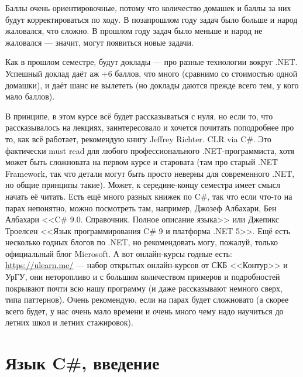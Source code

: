 \documentclass{../../text-style}
\begin{document}
Баллы очень ориентировочные, потому что количество домашек и баллы за них будут корректироваться по ходу. В позапрошлом году задач было больше и народ жаловался, что сложно. В прошлом году задач было меньше и народ не жаловался --- значит, могут появиться новые задачи.

Как в прошлом семестре, будут доклады --- про разные технологии вокруг .NET. Успешный доклад даёт аж +6 баллов, что много (сравнимо со стоимостью одной домашки), и даёт шанс не вылететь (но доклады даются прежде всего тем, у кого мало баллов).

В принципе, в этом курсе всё будет рассказываться с нуля, но если то, что рассказывалось на лекциях, заинтересовало и хочется почитать поподробнее про то, как всё работает, рекомендую книгу Jeffrey Richter. CLR via C\#. Это фактически must read для любого профессионального .NET-программиста, хотя может быть сложновата на первом курсе и старовата (там про старый .NET Framework, так что детали могут быть просто неверны для современного .NET, но общие принципы такие). Может, к середине-концу семестра имеет смысл начать её читать. Есть ещё много разных книжек по C\#, так что если что-то на парах непонятно, можно посмотреть там, например, Джозеф Албахари, Бен Албахари <<C\# 9.0. Справочник. Полное описание языка>> или Джепикс Троелсен <<Язык программирования C\# 9 и платформа .NET 5>>. Ещё есть несколько годных блогов по .NET, но рекомендовать могу, пожалуй, только официальный блог Microsoft. А вот онлайн-курсы годные есть: \url{https://ulearn.me/} --- набор открытых онлайн-курсов от СКБ <<Контур>> и УрГУ, они неторопливо и с большим количеством примеров и подробностей покрывают почти всю нашу программу (и даже рассказывают немного сверх, типа паттернов). Очень рекомендую, если на парах будет сложновато (а скорее всего будет, у нас очень мало времени и очень много чему надо научиться до летних школ и летних стажировок).

\section{Язык C\#, введение}
\end{document}
